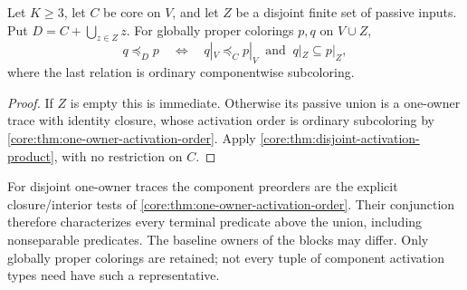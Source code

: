 \begin{corollary}
\label{core:prop:union-input-activation}
Let $K\geq3$, let $C$ be core on $V$, and let $Z$ be a disjoint finite
set of passive inputs. Put $D=C+\bigcup_{z\in Z}z$.
For globally proper colorings $p,q$ on $V\cup Z$,
\[
 q\preceq_D p\quad\Longleftrightarrow\quad
 q|_V\preceq_C p|_V\ \text{ and }\ q|_Z\subseteq p|_Z,
\]
where the last relation is ordinary componentwise subcoloring.
\end{corollary}
\begin{proof}
If $Z$ is empty this is immediate. Otherwise its passive union is a
one-owner trace with identity closure, whose activation order is
ordinary subcoloring by \cref{core:thm:one-owner-activation-order}.
Apply \cref{core:thm:disjoint-activation-product}, with no restriction on $C$.
\end{proof}

For disjoint one-owner traces the component preorders are the explicit
closure/interior tests of \cref{core:thm:one-owner-activation-order}.
Their conjunction therefore characterizes every terminal predicate
above the union, including nonseparable predicates. The baseline owners
of the blocks may differ. Only globally proper colorings are retained;
not every tuple of component activation types need have such a representative.


